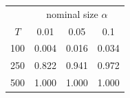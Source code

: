 % 
\begin{tabular}{cccc}
  \hline
  & \multicolumn{3}{c}{nominal size $\alpha$} \\
 $T$ & 0.01 & 0.05 & 0.1 \\
 \hline
100 & 0.004 & 0.016 & 0.034 \\ 
  250 & 0.822 & 0.941 & 0.972 \\ 
  500 & 1.000 & 1.000 & 1.000 \\ 
   \hline
\end{tabular}

